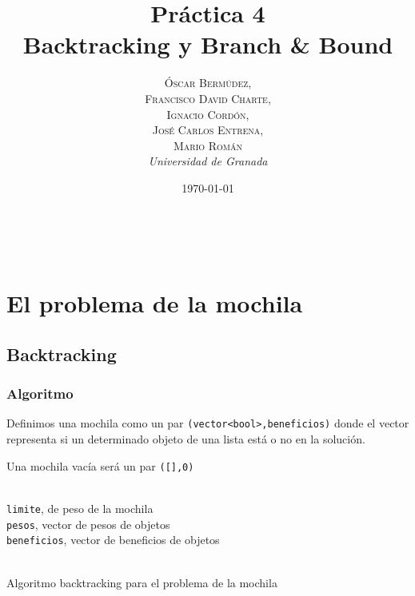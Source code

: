 \documentclass[a4paper, 11pt]{article} %
\title{\textbf{Práctica 4}\\ %
Backtracking y Branch \& Bound} %
\author{\textsc{Óscar Bermúdez,\\Francisco David Charte,\\Ignacio Cordón,\\José Carlos Entrena,\\Mario Román} %
\\{\textit{Universidad de Granada}}} %
\date{\today} %
\makeatletter
\let\emptyset\varnothing
\renewcommand{\maketitle}{ %
\begin{flushright} %
{\LARGE\@title} %

\vspace{50pt} %

{\large\@author} %
\\\@date %

\vspace{40pt} %
\end{flushright}
}
\makeatother
\begin{document}
\maketitle %

\renewcommand{\abstractname}{Resumen} %
\begin{abstract}
\end{abstract}
{\parskip=2pt
\tableofcontents
}
\pagebreak


\section{El problema de la mochila}

\subsection{Backtracking}
\subsubsection{Algoritmo}

Definimos una mochila como un par \texttt{(vector<bool>,beneficios)} donde el vector
representa si un determinado objeto de una lista está o no en la solución.

Una mochila vacía será un par \texttt{([],0)}
\begin{algorithm}[H]
	\begin{algorithmic}[1]
		\REQUIRE \ \\
        	\texttt{limite}, de peso de la mochila \\
        	\texttt{pesos}, vector de pesos de objetos\\
        	\texttt{beneficios}, vector de beneficios de objetos\\\
     	
     	\WHILE{\texttt{posibles\_mochilas}$\neq \emptyset$}
	    \ENDIF
	  \ELSE
	    \ENDIF
	  \ENDIF
     	\ENDWHILE
     	
	\end{algorithmic}
    \caption{Algoritmo backtracking para el problema de la mochila}
    \label{monedas}
\end{algorithm}  
\end{document}
